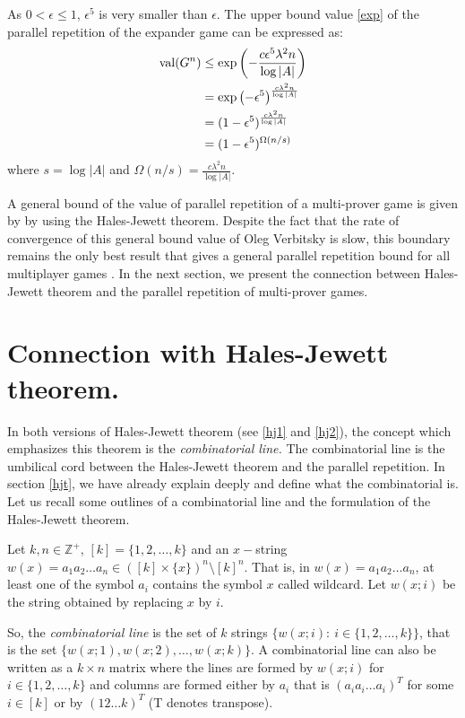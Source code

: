 As $0 < \epsilon \leq 1$, $\epsilon^5$ is very smaller than $\epsilon$. The upper bound value \eqref{exp} of the parallel repetition of the expander game can be expressed as:
\begin{align*}
\mathrm{val} (G^n) & \leq \exp \left(-\frac{c \epsilon^5 \lambda^2 n }{\log |A|}\right) \\
& =\exp \left(-\epsilon^5\right)^{\frac{c  \lambda^2 n }{\log |A|}} \\
& =(1-\epsilon^5)^{ \frac{c  \lambda^2 n }{\log |A|}} \\
& =(1-\epsilon^5)^{ \Omega(n/s)}
\end{align*}
where $s=\log |A|$ and $\Omega(n/s)=\frac{c  \lambda^2 n }{\log |A|}.$

A general bound of the value of parallel repetition of a multi-prover game is  given by  \cite{verbitsky1996towards} by using the Hales-Jewett theorem. Despite the fact that the rate of  convergence of this general bound value of Oleg Verbitsky is slow, this boundary  remains the only best result that gives a general parallel repetition bound for all multiplayer games \citep{hkazla2016forbidden,dinur2016multiplayer}. In the next section, we present the connection between Hales-Jewett theorem and the parallel repetition of  multi-prover games. 

\section{Connection with Hales-Jewett theorem.}

In both versions of Hales-Jewett theorem (see \eqref{hj1} and \eqref{hj2}), the concept which emphasizes this theorem is the \textit{combinatorial line.} The combinatorial line is the umbilical cord between the Hales-Jewett theorem and the parallel repetition. In section \eqref{hjt}, we have already explain deeply and define what the combinatorial is. Let us recall some outlines of a combinatorial line and the formulation of the Hales-Jewett theorem.

Let $k, n\in \mathbb{Z}^+$, $[k]=\{1,2, \ldots,k\}$ and an $x-$string $w(x)=a_1a_2\ldots a_n \in ([k]\times\{x\})^n\setminus [k]^n.$ That is, in $w(x)=a_1a_2\ldots a_n$, at least one of the symbol   $a_i$ contains the symbol  $x$ called wildcard. Let $w(x;i)$ be the string obtained by replacing $x$ by $i$.

So, the \textit{combinatorial line} is the set of $k$ strings $\{w(x;i): \ i\in \{1,2,\ldots,k\} \}$, that is the set $\{w(x;1), w(x;2), \ldots, w(x;k)\}.$ A combinatorial line can also be written as a $k\times n$ matrix where the lines are formed by $w(x;i)$ for $i \in \{1,2,\ldots,k \}$ and columns are formed either  by $a_i$ that is $(a_ia_i\ldots a_i)^T$  for some $i \in [k]$ or by $(12\ldots k)^T$ (T denotes  transpose).
 
